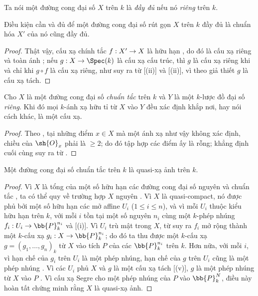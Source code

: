\documentclass[oneside,10pt]{amsart}
\makeatletter
\renewcommand{\leq}{\leqslant}
\renewcommand{\geq}{\geqslant}
\newcommand{\ega@arrow}[2]{\mathchoice{#1}{#2}{#2}{#2}}
\renewcommand{\to}{\ega@arrow{\longrightarrow}{\rightarrow}}
\newcommand{\oldpage}[2][]{\marginnote{\normalfont\footnotesize\textbf{#1}~|~#2}\ignorespaces}
\let\EGAOriginalLabel\label
\renewcommand{\label}[1]{\phantomsection\EGAOriginalLabel{#1}}
\makeatother
\begin{document}
\begin{env}[7.4.7]
\label{II.7.4.7}
Ta nói một đường cong đại số $X$ trên $k$ là \emph{đầy đủ} nếu nó \emph{riêng} trên $k$.
\end{env}

\begin{corollary}[7.4.8]
\label{II.7.4.8}
Điều kiện cần và đủ để một đường cong đại số rút gọn $X$ trên $k$ đầy đủ là chuẩn hóa $X'$ của nó cũng đầy đủ.
\end{corollary}

\oldpage[II]{150}
\begin{proof}
Thật vậy, cấu xạ chính tắc $f:X'\to X$ là hữu hạn , do đó là cấu xạ riêng  và toàn ánh ;
nếu $g:X\to\Spec(k)$ là cấu xạ cấu trúc, thì $g$ là cấu xạ riêng khi và chỉ khi $g\circ f$ là cấu xạ riêng, như suy ra từ [(ii)] và [(ii)], vì theo giả thiết $g$ là cấu xạ tách.
\end{proof}

\begin{proposition}[7.4.9]
\label{II.7.4.9}
Cho $X$ là một đường cong đại số \emph{chuẩn tắc} trên $k$ và $Y$ là một $k$-lược đồ đại số \emph{riêng}.
Khi đó mọi $k$-ánh xạ hữu tỉ từ $X$ vào $Y$ đều xác định khắp nơi, hay nói cách khác, là một cấu xạ.
\end{proposition}

\begin{proof}
Theo , tại những điểm $x\in X$ mà một ánh xạ như vậy không xác định, chiều của $\sh{O}_x$ phải là $\geq2$; do đó tập hợp các điểm ấy là rỗng;
khẳng định cuối cùng suy ra từ .
\end{proof}

\begin{corollary}[7.4.10]
\label{II.7.4.10}
Một đường cong đại số chuẩn tắc trên $k$ là quasi-xạ ảnh trên $k$.
\end{corollary}

\begin{proof}
Vì $X$ là tổng của một số hữu hạn các đường cong đại số nguyên và chuẩn tắc , ta có thể quy về trường hợp $X$ nguyên .
Vì $X$ là quasi-compact, nó được phủ bởi một số hữu hạn các mở affine $U_i$ ($1\leq i\leq n$), và vì mỗi $U_i$ thuộc kiểu hữu hạn trên $k$, với mỗi $i$ tồn tại một số nguyên $n_i$ cùng một $k$-phép nhúng $f_i:U_i\to\bb{P}_k^{n_i}$  và [(i)].
Vì $U_i$ trù mật trong $X$, từ  suy ra $f_i$ mở rộng thành một $k$-cấu xạ $g_i:X\to\bb{P}_k^{n_i}$; do đó ta thu được một $k$-cấu xạ $g=(g_1,\ldots,g_n)_k$ từ $X$ vào tích $P$ của các $\bb{P}_k^{n_i}$ trên $k$.
Hơn nữa, với mỗi $i$, vì hạn chế của $g_i$ trên $U_i$ là một phép nhúng, hạn chế của $g$ trên $U_i$ cũng là một phép nhúng .
Vì các $U_i$ phủ $X$ và $g$ là một cấu xạ tách [(v)], $g$ là một phép nhúng từ $X$ vào $P$ .
Vì cấu xạ Segre  cho một phép nhúng của $P$ vào $\bb{P}_k^N$, điều này hoàn tất chứng minh rằng $X$ là quasi-xạ ảnh.
\end{proof}
\end{document}
